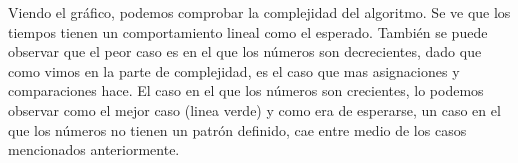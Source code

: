 \indent Viendo el gráfico, podemos comprobar la complejidad del algoritmo. Se ve que los tiempos tienen un comportamiento lineal como el esperado. También se puede observar que el peor caso es en el que los números son decrecientes, dado que como vimos en la parte de complejidad, es el caso que mas asignaciones y comparaciones hace. El caso en el que los números son crecientes, lo podemos observar como el mejor caso (linea verde) y como era de esperarse, un caso en el que los números no tienen un patrón definido, cae entre medio de los casos mencionados anteriormente. \\


